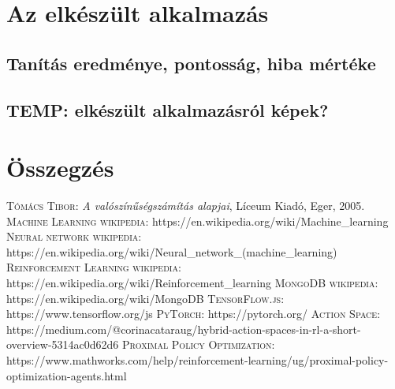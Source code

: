 \documentclass[
]{thesis-ekf}
\theoremstyle{definition}
\theoremstyle{remark}
\begin{document}
\chapter{Az elkészült alkalmazás}

\section{Tanítás eredménye, pontosság, hiba mértéke}

\section{TEMP: elkészült alkalmazásról képek?}

\chapter*{Összegzés}


\begin{thebibliography}{2}
\textsc{Tómács Tibor}: \emph{A valószínűségszámítás alapjai}, Líceum Kiadó, Eger, 2005.
\textsc{Machine Learning wikipedia}: https://en.wikipedia.org/wiki/Machine\_learning
\textsc{Neural network wikipedia}: https://en.wikipedia.org/wiki/Neural\_network\_(machine\_learning)
\textsc{Reinforcement Learning wikipedia}: https://en.wikipedia.org/wiki/Reinforcement\_learning
\textsc{MongoDB wikipedia}: https://en.wikipedia.org/wiki/MongoDB
\textsc{TensorFlow.js}: https://www.tensorflow.org/js
\textsc{PyTorch}: https://pytorch.org/
\textsc{Action Space}: https://medium.com/@corinacataraug/hybrid-action-spaces-in-rl-a-short-overview-5314ac0d62d6
\textsc{Proximal Policy Optimization}: https://www.mathworks.com/help/reinforcement-learning/ug/proximal-policy-optimization-agents.html
\end{thebibliography}


\end{document}

